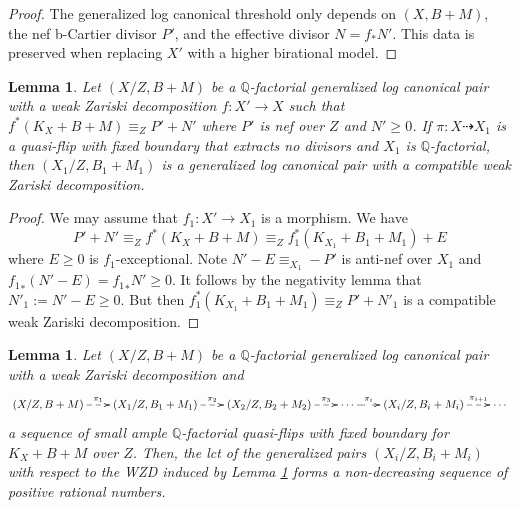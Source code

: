 \documentclass{amsart}
\renewcommand{\qq}{\mathbb{Q}}
\newtheorem{lemma}[theorem]{Lemma}
\theoremstyle{remark}
\numberwithin{equation}{section}
\begin{document}
\begin{proof}
The generalized log canonical threshold only depends on $(X,B+M)$, the nef b-Cartier divisor $P'$, 
and the effective divisor $N= f_*N'$.
This data is preserved when replacing $X'$ with a higher birational model.
\end{proof}

\begin{lemma}\label{WZDpreserved} Let $(X/Z,B+M)$ be a $\qq$-factorial generalized log canonical pair with a weak Zariski decomposition $f:X'\to X$ such that $f^*(K_X+B+M)\equiv_Z P'+N'$ where $P'$ is nef over $Z$ and $N'\geq 0$. 
If $\pi:X\dasharrow X_1$ is a quasi-flip with fixed boundary that extracts no divisors and $X_1$ is $\qq$-factorial, then $(X_1/Z,B_1+M_1)$ is a generalized log canonical pair with a compatible weak Zariski decomposition.
\end{lemma}
\begin{proof} We may assume that $f_1:X'\to X_1$ is a morphism. We have 
$$P'+N'\equiv _Z f^*(K_X+B+M)\equiv _Zf_1^*(K_{X_1}+B_1+M_1)+E$$ 
where $E\geq 0$ is $f_1$-exceptional.
Note $N'-E \equiv_{X_1} -P'$ is anti-nef over $X_1$
and ${f_1}_*(N'-E) = {f_1}_* N'  \geq 0$. 
It follows by the negativity lemma that $N'_1:=N'-E\geq 0$. 
But then $f_1^*(K_{X_1}+B_1+M_1)\equiv _Z P'+N'_1$ is a compatible weak Zariski decomposition.
\end{proof}

\begin{lemma}\label{nondecreasing}
Let $(X/Z,B+M)$ be a $\qq$-factorial generalized log canonical pair with a weak Zariski decomposition
and 
\[
 \xymatrix@C=2em{
(X/Z,B+M)\ar@{-->}[r]^-{\pi_1} & (X_1/Z,B_1+M_1)\ar@{-->}[r]^-{\pi_2} & (X_2/Z,B_2+M_2) \ar@{-->}[r]^-{\pi_3} & 
\cdots \ar@{-->}[r]^-{\pi_i} & (X_i/Z,B_i+M_i)\ar@{-->}[r]^-{\pi_{i+1}} & \cdots
 }
\]
a sequence of small ample $\qq$-factorial quasi-flips with fixed boundary for $K_X+B+M$ over $Z$.
Then, the lct of the generalized pairs $(X_i/Z,B_i+M_i)$ with respect to the WZD induced by Lemma \ref{WZDpreserved}
forms a non-decreasing sequence of positive rational numbers. 
\end{lemma}
\end{document}
